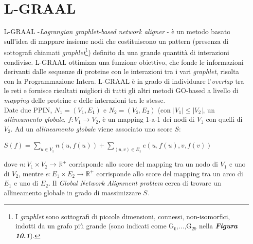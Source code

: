 \documentclass[11pt]{article}
\begin{document}
\section{L-GRAAL}
L-GRAAL -\textit{Lagrangian graphlet-based network aligner} - è un metodo basato sull'idea di mappare insieme nodi che costituiscono un pattern (presenza di sottografi chiamati \textit{graphlet}\footnote{I \textit{graphlet} sono sottografi di piccole dimensioni, connessi, non-isomorfici, indotti da un grafo più grande (sono indicati come G$_0$,...,G$_{29}$ nella \textit{\textbf{Figura 10.1}}).}) definito da una grande quantità di interazioni condivise. L-GRAAL ottimizza una funzione obiettivo, che fonde le informazioni derivanti dalle sequenze di proteine con le interazioni tra i vari \textit{graphlet}, risolta con la Programmazione Intera. L-GRAAL è in grado di individuare l'\textit{overlap} tra le reti e fornisce risultati migliori di tutti gli altri metodi GO-based a livello di \textit{mapping} delle proteine e delle interazioni tra le stesse.\\

Date due PPIN, $N_1 = (V_1, E_1)$ e $N_2 = (V_2, E_2)$ (con $|V_1| \leq |V_2|$, un \textit{allineamento globale}, $f: V_1 \rightarrow V_2$, è un mapping 1-a-1 dei nodi di $V_1$ con quelli di $V_2$. Ad un \textit{allineamento globale} viene associato uno score $S$:
\begin{center}
$S(f) = \displaystyle{\sum_{u \in V_1}n(u,f(u))} + \displaystyle{\sum_{(u,v) \in E_1}e(u,f(u),v,f(v))}$
\end{center}
dove $n : V_1 \times V_2 \rightarrow \mathbb{R}^+$ corrisponde allo score del mapping tra un nodo di $V_1$ e uno di $V_2$, mentre $e : E_1 \times E_2 \rightarrow \mathbb{R}^+$ corrisponde allo score del mapping tra un arco di $E_1$ e uno di $E_2$. Il \textit{Global Network Alignment problem} cerca di trovare un allineamento globale in grado di massimizzare $S$.
\end{document}
